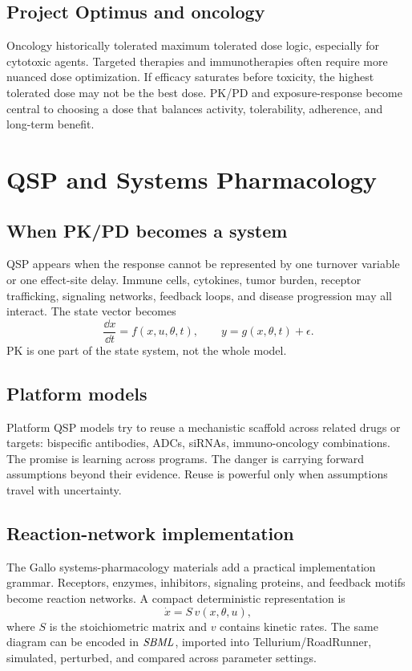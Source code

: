 \documentclass[a4paper]{article}
\newcommand{\pkSBML}{\pksym{SBML}}
\begin{document}
\subsection{Project Optimus and oncology}

Oncology historically tolerated maximum tolerated dose logic, especially for cytotoxic agents. Targeted therapies and immunotherapies often require more nuanced dose optimization. If efficacy saturates before toxicity, the highest tolerated dose may not be the best dose. PK/PD and exposure-response become central to choosing a dose that balances activity, tolerability, adherence, and long-term benefit.

\section{QSP and Systems Pharmacology}

\subsection{When PK/PD becomes a system}

QSP appears when the response cannot be represented by one turnover variable or one effect-site delay. Immune cells, cytokines, tumor burden, receptor trafficking, signaling networks, feedback loops, and disease progression may all interact. The state vector becomes
\[
  \frac{\dd x}{\dd t}=f(x,u,\theta,t),
  \qquad
  y=g(x,\theta,t)+\epsilon.
\]
PK is one part of the state system, not the whole model.

\subsection{Platform models}

Platform QSP models try to reuse a mechanistic scaffold across related drugs or targets: bispecific antibodies, ADCs, siRNAs, immuno-oncology combinations. The promise is learning across programs. The danger is carrying forward assumptions beyond their evidence. Reuse is powerful only when assumptions travel with uncertainty.

\subsection{Reaction-network implementation}

The Gallo systems-pharmacology materials add a practical implementation grammar. Receptors, enzymes, inhibitors, signaling proteins, and feedback motifs become reaction networks. A compact deterministic representation is
\[
  \dot x = S\,v(x,\theta,u),
\]
where \(S\) is the stoichiometric matrix and \(v\) contains kinetic rates. The same diagram can be encoded in \(\pkSBML\), imported into Tellurium/RoadRunner, simulated, perturbed, and compared across parameter settings.
\end{document}
